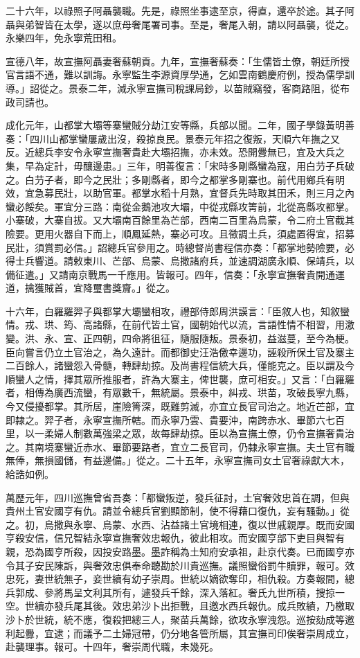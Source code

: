 \begin{pinyinscope}
二十六年，以祿照子阿聶襲職。先是，祿照坐事逮至京，得直，還卒於途。其子阿聶與弟智皆在太學，遂以庶母奢尾署司事。至是，奢尾入朝，請以阿聶襲，從之。永樂四年，免永寧荒田租。

宣德八年，故宣撫阿聶妻奢蘇朝貢。九年，宣撫奢蘇奏：「生儒皆土僚，朝廷所授官言語不通，難以訓誨。永寧監生李源資厚學通，乞如雲南鶴慶府例，授為儒學訓導。」詔從之。景泰二年，減永寧宣撫司稅課局鈔，以苗賊竊發，客商路阻，從布政司請也。

成化元年，山都掌大壩等寨蠻賊分劫江安等縣，兵部以聞。二年，國子學錄黃明善奏：「四川山都掌蠻屢歲出沒，殺掠良民。景泰元年招之復叛，天順六年撫之又反。近總兵李安令永寧宣撫奢貴赴大壩招撫，亦未效。恐開釁無已，宜及大兵之集，早為定計，毋釀邊患。」三年，明善復言：「宋時多剛縣蠻為寇，用白芀子兵破之。白芀子者，即今之民壯；多剛縣者，即今之都掌多剛寨也。前代用鄉兵有明效，宜急募民壯，以助官軍。都掌水稻十月熟，宜督兵先時取其田禾，則三月之內蠻必餒矣。軍宜分三路：南從金鵝池攻大壩，中從戎縣攻箐前，北從高縣攻都掌。小寨破，大寨自拔。又大壩南百餘里為芒部，西南二百里為烏蒙，令二府土官截其險要。更用火器自下而上，順鳳延熱，寨必可攻。且徵調土兵，須處置得宜，招募民壯，須賞罰必信。」詔總兵官參用之。時總督尚書程信亦奏：「都掌地勢險要，必得士兵響道。請敕東川、芒部、烏蒙、烏撒諸府兵，並速調湖廣永順、保靖兵，以備征遣。」又請南京戰馬一千應用。皆報可。四年，信奏：「永寧宣撫奢貴開通運道，擒獲賊首，宜降璽書獎齎。」從之。

十六年，白羅羅羿子與都掌大壩蠻相攻，禮部侍郎周洪謨言：「臣敘人也，知敘蠻情。戎、珙、筠、高諸縣，在前代皆土官，國朝始代以流，言語性情不相習，用激變。洪、永、宣、正四朝，四命將徂征，隨服隨叛。景泰初，益滋蔓，至今為梗。臣向嘗言仍立土官治之，為久遠計。而都御史汪浩儌幸邊功，誣殺所保土官及寨主二百餘人，諸蠻怨入骨髓，轉肆劫掠。及尚書程信統大兵，僅能克之。臣以謂及今順蠻人之情，擇其眾所推服者，許為大寨主，俾世襲，庶可相安。」又言：「白羅羅者，相傳為廣西流蠻，有眾數千，無統屬。景泰中，糾戎、珙苗，攻破長寧九縣，今又侵擾都掌。其所居，崖險箐深，既難剪滅，亦宜立長官司治之。地近芒部，宜即隸之。羿子者，永寧宣撫所轄。而永寧乃雲、貴要沖，南跨赤水、畢節六七百里，以一柔婦人制數萬強梁之眾，故每肆劫掠。臣以為宣撫土僚，仍令宣撫奢貴治之。其南境寨蠻近赤水、畢節要路者，宜立二長官司，仍隸永寧宣撫。夫土官有職無俸，無損國儲，有益邊備。」從之。二十五年，永寧宣撫司女土官奢祿獻大木，給誥如例。

萬歷元年，四川巡撫曾省吾奏：「都蠻叛逆，發兵征討，土官奢效忠首在調，但與貴州土官安國亨有仇。請並令總兵官劉顯節制，使不得藉口復仇，妄有騷動。」從之。初，烏撒與永寧、烏蒙、水西、沾益諸土官境相連，復以世戚親厚。既而安國亨殺安信，信兄智結永寧宣撫奢效忠報仇，彼此相攻。而安國亨部下吏目與智有親，恐為國亨所殺，因投安路墨。墨詐稱為土知府安承祖，赴京代奏。已而國亨亦令其子安民陳訴，與奢效忠俱奉命聽勘於川貴巡撫。議照蠻俗罰牛贖罪，報可。效忠死，妻世統無子，妾世續有幼子崇周。世統以嫡欲奪印，相仇殺。方奏報間，總兵郭成、參將馬呈文利其所有，遽發兵千餘，深入落紅。奢氏九世所積，搜掠一空。世續亦發兵尾其後。效忠弟沙卜出拒戰，且邀水西兵報仇。成兵敗績，乃檄取沙卜於世統，統不應，復殺把總三人，聚苗兵萬餘，欲攻永寧洩怨。巡按劾成等邀利起釁，宜逮；而議予二土婦冠帶，仍分地各管所屬，其宣撫司印俟奢崇周成立，赴襲理事。報可。十四年，奢崇周代職，未幾死。


\end{pinyinscope}
